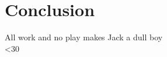 \Clear
\chapter{Conclusion}
\label{cha:conclusion}

\centering
\newcount\zz
\loop
All work and no play makes Jack a dull boy \\
\advance{}
\ifnum\zz<30
\repeat

